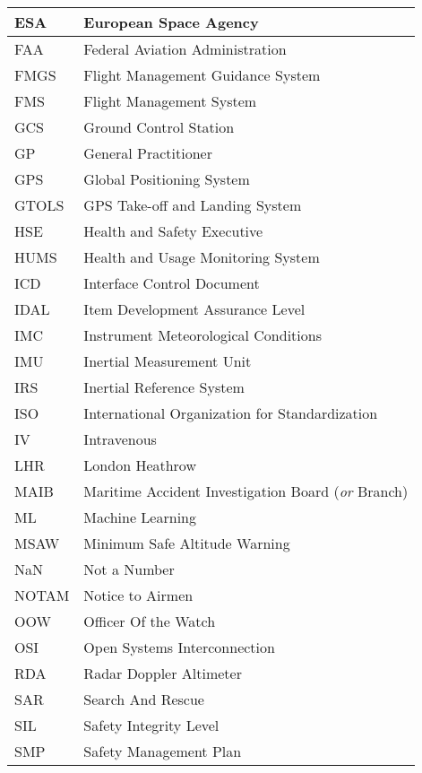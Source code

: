 \begin{longtable}{|L{}|L{}|}
  ESA & European Space Agency\\\hline
	FAA & Federal Aviation Administration\\\hline
  FMGS & Flight Management Guidance System\\\hline
  FMS & Flight Management System\\\hline
	GCS & Ground Control Station\\\hline
  GP & General Practitioner\\\hline
	GPS & Global Positioning System\\\hline
  GTOLS & GPS Take-off and Landing System\\\hline
	HSE & Health and Safety Executive\\\hline
  HUMS & Health and Usage Monitoring System\\\hline
	ICD & Interface Control Document\\\hline
  IDAL & Item Development Assurance Level\\\hline
  IMC & Instrument Meteorological Conditions\\\hline
	IMU & Inertial Measurement Unit\\\hline
	IRS & Inertial Reference System\\\hline
  ISO & International Organization for Standardization\\\hline %
	IV & Intravenous\\\hline
  LHR & London Heathrow\\\hline
	MAIB & Maritime Accident Investigation Board (\textit{or} Branch)\\\hline
        ML & Machine Learning\\\hline
	MSAW & Minimum Safe Altitude Warning\\\hline
  NaN & Not a Number\\\hline
  NOTAM & Notice to Airmen\\\hline
  OOW & Officer Of the Watch\\\hline
  OSI & Open Systems Interconnection\\\hline
	RDA & Radar Doppler Altimeter\\\hline
	SAR & Search And Rescue\\\hline
  SIL & Safety Integrity Level\\\hline
  SMP & Safety Management Plan\\\hline

\end{longtable}
